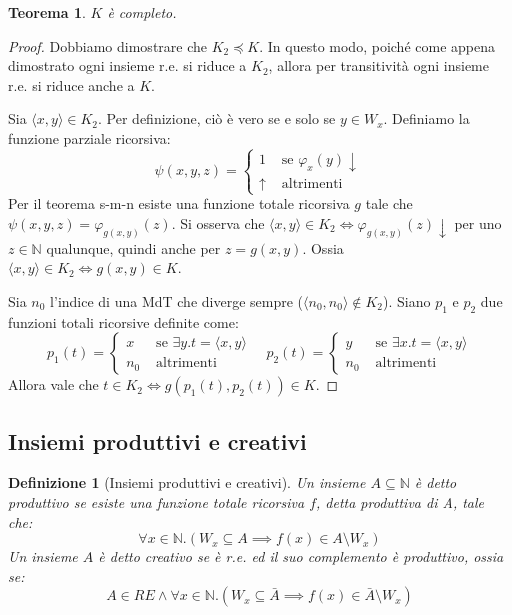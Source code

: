 \documentclass[a4paper,titlepage]{article}
\newtheorem{theorem}{Teorema}[section]
\newtheorem{definition}{Definizione}[section]
\theoremstyle{definition}
\newcommand{\N}{\mathbb{N}}
\begin{document}
\begin{theorem}
	$K$ è completo. 
\end{theorem}
\begin{proof}
	Dobbiamo dimostrare che $K_2\preceq K$. In questo modo, poiché come appena dimostrato ogni insieme r.e. si riduce a $K_2$, allora per transitività ogni insieme r.e. si riduce anche a $K$. 
	
	Sia $\langle x,y\rangle\in K_2$. Per definizione, ciò è vero se e solo se $y\in W_x$. Definiamo la funzione parziale ricorsiva:
	\[
		\psi(x,y,z) =
		\begin{cases}
			1 			  &\text{ se } \varphi_x(y)\downarrow\\
			\uparrow &\text{ altrimenti}
		\end{cases}
	\]
	Per il teorema s-m-n esiste una funzione totale ricorsiva $g$ tale che $\psi(x,y,z)=\varphi_{g(x,y)}(z)$. Si osserva che $\langle x,y\rangle\in K_2\iff \varphi_{g(x,y)}(z)\downarrow$ per uno $z\in\N$ qualunque, quindi anche per $z=g(x,y)$. Ossia $\langle x, y\rangle\in K_2\iff g(x,y)\in K$.  
	
	Sia $n_0$ l'indice di una MdT che diverge sempre ($\langle n_0,n_0\rangle\notin K_2$). Siano $p_1$ e $p_2$ due funzioni totali ricorsive definite come:
	\[
		p_1(t) =
		\begin{cases}
			x 	   &\text{ se } \exists y.t=\langle x, y\rangle\\
			n_0  &\text{ altrimenti } 
		\end{cases}
		\quad
		p_2(t)=
		\begin{cases}
		y 	   &\text{ se } \exists x.t=\langle x, y\rangle\\
		n_0  &\text{ altrimenti } 
		\end{cases}
	\]
	Allora vale che $t\in K_2\iff g(p_1(t),p_2(t))\in K$.
\end{proof}

\subsection{Insiemi produttivi e creativi}
\begin{definition}[Insiemi produttivi e creativi]
	Un insieme $A\subseteq\N$ è detto produttivo se esiste una funzione totale ricorsiva $f$, detta produttiva di A, tale che:
	\[
		\forall x\in\N.(W_x\subseteq A\implies f(x)\in A\setminus W_x)
	\]
	Un insieme $A$ è detto creativo se è r.e. ed il suo complemento è produttivo, ossia se:
	\[
		A\in RE\land \forall x\in\N.(W_x\subseteq\bar A\implies f(x)\in\bar A\setminus W_x)
	\]
\end{definition}
\end{document}
